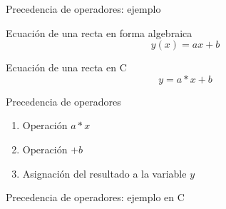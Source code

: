 \documentclass[xcolor=pdftex,table,11pt]{beamer}
\begin{document}
\begin{frame}{Precedencia de operadores: ejemplo}


 \begin{block}{Ecuación de una recta en forma algebraica}
\begin{equation}
y(x) = a x + b
\end{equation}
    \end{block}
    

 \begin{block}{Ecuación de una recta en C}
\begin{equation}
y = a * x + b
\end{equation}


  \end{block}

 \begin{block}{Precedencia de operadores}
 \begin{enumerate}
\item Operación $a * x$
\item Operación $+b$
\item Asignación del resultado a la variable $y$
\end{enumerate}
  \end{block}
\end{frame}
\begin{frame}{Precedencia de operadores: ejemplo en C}
\codesetstylefrombeamer
{}
\end{frame}
\end{document}
